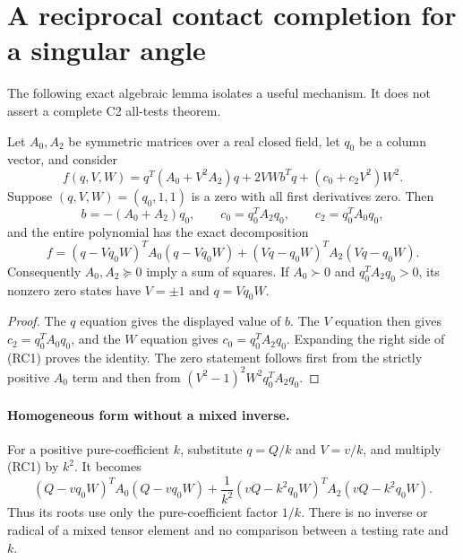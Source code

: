 \section[A reciprocal contact completion for a singular angle]{A reciprocal contact completion for a singular angle}
\label{sec:ui-reciprocal-contact}

The following exact algebraic lemma isolates a useful mechanism. It
does not assert a complete C2 all-tests theorem.

\begin{lemma}
Let $A_0,A_2$ be symmetric matrices over a real closed field, let
$q_0$ be a column vector, and consider
\[
 f(q,V,W)=q^T(A_0+V^2A_2)q+2VW b^Tq+(c_0+c_2V^2)W^2.
\]
Suppose $(q,V,W)=(q_0,1,1)$ is a zero with all first derivatives
zero. Then
\[
 b=-(A_0+A_2)q_0,\qquad
 c_0=q_0^TA_2q_0,\qquad c_2=q_0^TA_0q_0,
\]
and the entire polynomial has the exact decomposition
\[
 \boxed{f=(q-Vq_0W)^TA_0(q-Vq_0W)
             +(Vq-q_0W)^TA_2(Vq-q_0W).}             \tag{RC1}
\]
Consequently $A_0,A_2\succeq0$ imply a sum of squares. If
$A_0\succ0$ and $q_0^TA_2q_0>0$, its nonzero zero states have
$V=\pm1$ and $q=Vq_0W$.
\end{lemma}
\begin{proof}
The $q$ equation gives the displayed value of $b$. The $V$
equation then gives $c_2=q_0^TA_0q_0$, and the $W$ equation gives
$c_0=q_0^TA_2q_0$. Expanding the right side of (RC1) proves the
identity. The zero statement follows first from the strictly positive
$A_0$ term and then from $(V^2-1)^2W^2q_0^TA_2q_0$.
\end{proof}

\paragraph{Homogeneous form without a mixed inverse.}
For a positive pure-coefficient $k$, substitute $q=Q/k$ and
$V=v/k$, and multiply (RC1) by $k^2$. It becomes
\[
 (Q-vq_0W)^TA_0(Q-vq_0W)
 +\frac1{k^2}(vQ-k^2q_0W)^TA_2(vQ-k^2q_0W).       \tag{RC2}
\]
Thus its roots use only the pure-coefficient factor $1/k$.
There is no inverse or radical of a mixed tensor element and no
comparison between a testing rate and $k$.

